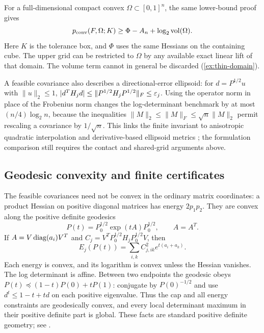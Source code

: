 For a full-dimensional compact convex $\Omega\subset[0,1]^n$, the same
lower-bound proof gives
\begin{equation}\label{eq:finite-domain-volume}
 p_{\mathrm{conv}}(F,\Omega;K)\ge\Phi-A_n+\log_2\operatorname{vol}(\Omega).
\end{equation}
Here $K$ is the tolerance box, and $\Phi$ uses the same Hessians on the
containing cube. The upper grid can be restricted to $\Omega$ by any
available exact linear lift of that domain. The volume term cannot in
general be discarded (\cref{ex:thin-domain}).

A feasible covariance also describes a directional-error ellipsoid: for
$d=P^{1/2}u$ with $\|u\|_2\le1$,
$|d^TH_jd|\le\|P^{1/2}H_jP^{1/2}\|_F\le\varepsilon_j$.
Using the operator norm in place of the Frobenius norm changes the
log-determinant benchmark by at most $(n/4)\log_2n$, because the
inequalities $\|M\|_2\le\|M\|_F\le\sqrt n\|M\|_2$ permit rescaling a
covariance by $1/\sqrt n$. This links the finite invariant to
anisotropic quadratic interpolation and derivative-based ellipsoid
metrics \citep{cao2007}; the formulation comparison still requires the
contact and shared-grid arguments above.

\subsection{Geodesic convexity and finite certificates}

The feasible covariances need not be convex in the ordinary matrix
coordinates: a product Hessian on positive diagonal matrices has energy
$2p_1p_2$. They are convex along the positive definite geodesics
\[
 P(t)=P_0^{1/2}\exp(tA)P_0^{1/2},\qquad A=A^T.
\]
If $A=V\operatorname{diag}(a_i)V^T$ and $C_j=V^TP_0^{1/2}H_jP_0^{1/2}V$, then
\begin{equation}\label{eq:energy-geodesic}
 E_j(P(t))=\sum_{i,k}C_{j,ik}^2e^{t(a_i+a_k)}.
\end{equation}
Each energy is convex, and its logarithm is convex unless the Hessian
vanishes. The log determinant is affine. Between two endpoints the
geodesic obeys $P(t)\preceq(1-t)P(0)+tP(1)$: conjugate by $P(0)^{-1/2}$
and use $d^t\le1-t+td$ on each positive eigenvalue. Thus the cap and
all energy constraints are geodesically convex, and every local
determinant maximum in their positive definite part is global. These
facts are standard positive definite geometry; see \citet{sra2013}.

